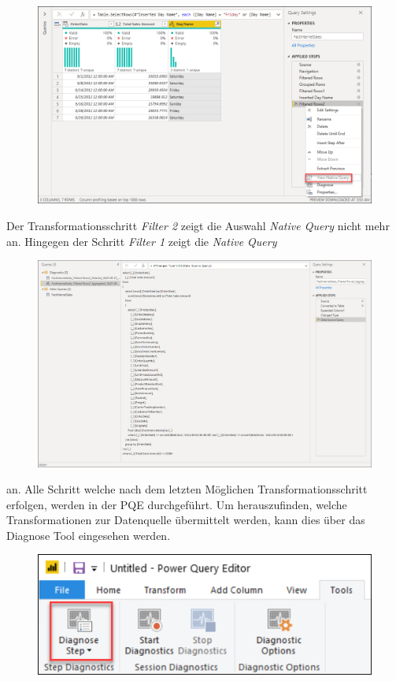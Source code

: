\begin{figure}[H]
	\centering
	\includegraphics[scale = 0.3]{attachment/chapter_1/Scc168}
\end{figure}
Der Transformationsschritt \textit{Filter 2} zeigt die Auswahl \textit{Native Query} nicht mehr an. Hingegen der Schritt \textit{Filter 1} zeigt die \textit{Native Query}
\begin{figure}[H]
	\centering
	\includegraphics[scale = 0.3]{attachment/chapter_1/Scc169}
\end{figure}
an. Alle Schritt welche nach dem letzten Möglichen Transformationsschritt erfolgen, werden in der \gls{PQE} durchgeführt.
Um herauszufinden, welche Transformationen zur Datenquelle übermittelt werden, kann dies über das Diagnose Tool eingesehen werden.
\begin{figure}[H]
	\centering
	\includegraphics[scale = 0.3]{attachment/chapter_1/Scc170}
\end{figure}

